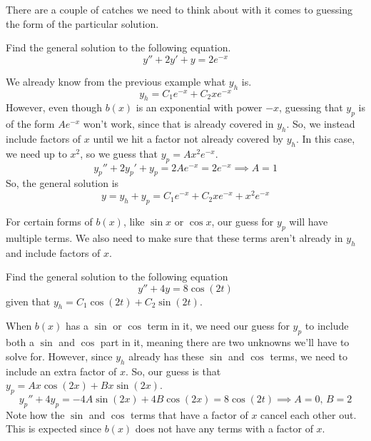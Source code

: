 \noindent
There are a couple of catches we need to think about with it comes to guessing the form of the particular solution.
\begin{example}
	Find the general solution to the following equation.
	\begin{equation*}
		y'' + 2y' + y = 2e^{-x}
	\end{equation*}
\end{example}
\noindent
We already know from the previous example what $y_h$ is.
\begin{equation*}
	y_h = C_1e^{-x} + C_2xe^{-x}
\end{equation*}
However, even though $b(x)$ is an exponential with power $-x$, guessing that $y_p$ is of the form $Ae^{-x}$ won't work, since that is already covered in $y_h$. So, we instead include factors of $x$ until we hit a factor not already covered by $y_h$. In this case, we need up to $x^2$, so we guess that $y_p = Ax^2e^{-x}$.
\begin{equation*}
	y_p'' + 2y_p'+ y_p = 2Ae^{-x} = 2e^{-x} \implies A = 1
\end{equation*}
So, the general solution is
\begin{equation*}
	y = y_h + y_p = C_1e^{-x} + C_2xe^{-x} + x^2e^{-x}
\end{equation*}

\noindent
For certain forms of $b(x)$, like $\sin{x}$ or $\cos{x}$, our guess for $y_p$ will have multiple terms. We also need to make sure that these terms aren't already in $y_h$ and include factors of $x$.
\begin{example}
	Find the general solution to the following equation
	\begin{equation*}
		y'' + 4y = 8\cos{(2t)}
	\end{equation*}
	given that $y_h = C_1\cos{(2t)} + C_2\sin{(2t)}$.
\end{example}
\noindent
When $b(x)$ has a $\sin$ or $\cos$ term in it, we need our guess for $y_p$ to include both a $\sin$ and $\cos$ part in it, meaning there are two unknowns we'll have to solve for. However, since $y_h$ already has these $\sin$ and $\cos$ terms, we need to include an extra factor of $x$. So, our guess is that $y_p = Ax\cos{(2x)} + Bx\sin{(2x)}$.
\begin{equation*}
	y_p'' + 4y_p = -4A\sin{(2x)} + 4B\cos{(2x)} = 8\cos{(2t)} \implies A = 0 \text{, } B = 2
\end{equation*}
Note how the $\sin$ and $\cos$ terms that have a factor of $x$ cancel each other out. This is expected since $b(x)$ does not have any terms with a factor of $x$.\\

